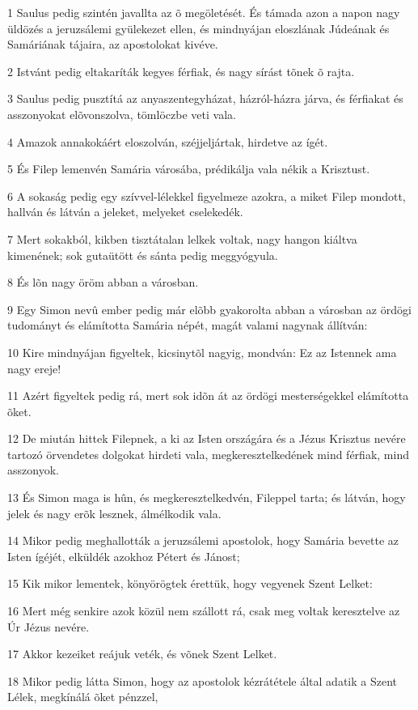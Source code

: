 \par 1 Saulus pedig szintén javallta az õ megöletését. És támada azon a napon nagy üldözés a jeruzsálemi gyülekezet ellen, és mindnyájan eloszlának  Júdeának és Samáriának tájaira, az apostolokat kivéve.
\par 2 Istvánt pedig eltakaríták kegyes férfiak, és nagy sírást tõnek õ rajta.
\par 3 Saulus pedig pusztítá az anyaszentegyházat, házról-házra járva, és férfiakat és asszonyokat elõvonszolva, tömlöczbe veti vala.
\par 4 Amazok annakokáért eloszolván, széjjeljártak, hirdetve az ígét.
\par 5 És Filep lemenvén Samária városába, prédikálja vala nékik a Krisztust.
\par 6 A sokaság pedig egy szívvel-lélekkel figyelmeze azokra, a miket Filep mondott, hallván és látván a jeleket, melyeket cselekedék.
\par 7 Mert sokakból, kikben tisztátalan lelkek voltak, nagy hangon kiáltva kimenének; sok gutaütött és sánta pedig meggyógyula.
\par 8 És lõn nagy öröm abban a városban.
\par 9 Egy Simon nevû ember pedig már elõbb gyakorolta abban a városban az ördögi tudományt és elámította Samária népét, magát valami nagynak állítván:
\par 10 Kire mindnyájan figyeltek, kicsinytõl nagyig, mondván: Ez az Istennek ama nagy ereje!
\par 11 Azért figyeltek pedig rá, mert sok idõn át az ördögi mesterségekkel elámította õket.
\par 12 De miután hittek Filepnek, a ki az Isten országára és a Jézus Krisztus nevére tartozó örvendetes dolgokat hirdeti vala, megkeresztelkedének mind férfiak, mind asszonyok.
\par 13 És Simon maga is hûn, és megkeresztelkedvén, Fileppel tarta; és látván, hogy jelek és nagy erõk lesznek, álmélkodik vala.
\par 14 Mikor pedig meghallották a jeruzsálemi apostolok, hogy Samária bevette az Isten ígéjét, elküldék azokhoz Pétert és Jánost;
\par 15 Kik mikor lementek, könyörögtek érettük, hogy vegyenek Szent Lelket:
\par 16 Mert még senkire azok közül nem szállott rá, csak meg voltak keresztelve az Úr Jézus nevére.
\par 17 Akkor kezeiket reájuk veték, és võnek Szent Lelket.
\par 18 Mikor pedig látta Simon, hogy az apostolok kézrátétele által adatik a Szent Lélek, megkínálá õket pénzzel,
